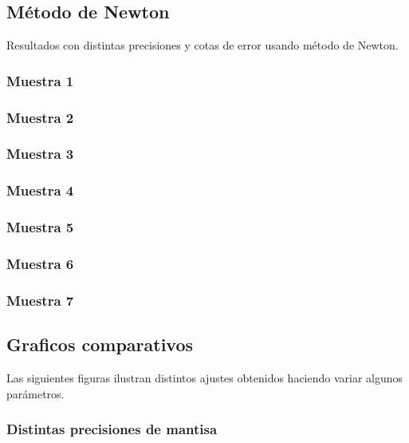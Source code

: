 \documentclass[a4paper,10pt,twoside]{article}
\begin{document}
\subsection{Método de Newton}
Resultados con distintas precisiones y cotas de error usando  método de Newton.

\subsubsection{Muestra 1}

\subsubsection{Muestra 2}

\subsubsection{Muestra 3}

\subsubsection{Muestra 4}

\subsubsection{Muestra 5}

\subsubsection{Muestra 6}

\subsubsection{Muestra 7}

\subsection{Graficos comparativos}
Las siguientes figuras ilustran distintos ajustes obtenidos haciendo variar algunos parámetros.

\subsubsection{Distintas precisiones de mantisa}
\end{document}
